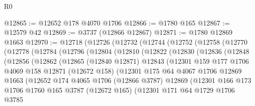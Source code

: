 \begin{lexlean}{R0}
\begin{coremodule}
@12865 := @12652 @178 @4070 @1706
@12866 := @1780 @165
@12867 := @12579 @42
@12869 := @3737 (@12866 @12867)
@12871 := @1780 @12869 @1663
@12970 := @12718
    (@12726
      (@12732
        (@12744
          (@12752
            (@12758
              (@12770
                (@12778
                  (@12784
                    (@12796
                      (@12804
                        (@12810
                          (@12822
                            (@12830
                              (@12836
                                (@12848
                                  (@12856
                                    (@12862
                                      (@12865
                                        (@12840 @12871)
                                        @12843
                                        (@12301
                                          @159
                                          @177
                                          @1706
                                          @4069
                                          @158
                                          @12871
                                          (@12672 @158)
                                          (@12301
                                            @175
                                            @64
                                            @4067
                                            @1706
                                            @12869
                                            @1663
                                            (@12652
                                              @174
                                              @4065
                                              @1706
                                              (@12866 @3787)
                                              @12869
                                              (@12301
                                                @166
                                                @173
                                                @1706
                                                @1760
                                                @165
                                                @3787
                                                (@12672 @165)
                                                (@12301
                                                  @171
                                                  @64
                                                  @1729
                                                  @1706
                                                  @3785

\end{coremodule}
\end{lexlean}
